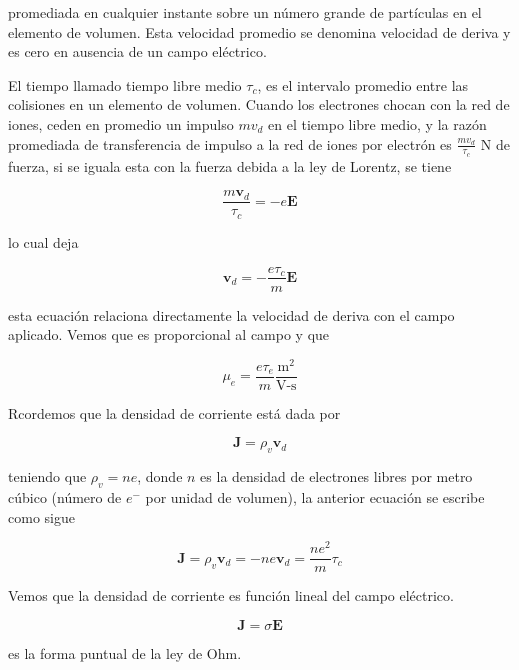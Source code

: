 promediada en cualquier instante sobre un número grande de partículas en el elemento de volumen. Esta velocidad promedio se denomina velocidad de deriva y es cero en ausencia de un campo eléctrico.

El tiempo llamado tiempo libre medio $\tau_c$, es el intervalo promedio entre las colisiones en un elemento de volumen. Cuando los electrones chocan con la red de iones, ceden en promedio un impulso $m v_d$ en el tiempo libre medio, y la razón promediada de transferencia de impulso a la red de iones por electrón es $\frac{m v_d}{\tau_c}$ N de fuerza, si se iguala esta con la fuerza debida a la ley de Lorentz, se tiene

\begin{equation*}
\frac{m \mathbf{v}_d}{\tau_c} = -e \mathbf{E}
\end{equation*}

 lo cual deja

 \begin{equation*}
\mathbf{v}_d = - \frac{e \tau_c}{m} \mathbf{E}
 \end{equation*}

 esta ecuación relaciona directamente la velocidad de deriva con el campo aplicado. Vemos que es proporcional al campo y que 

 \begin{equation*}
\mu_e = \frac{e \tau_e}{m} \frac{\text{m}^2}{\text{V-s}}
 \end{equation*}

 Rcordemos que la densidad de corriente está dada por 

 \begin{equation*}
\mathbf{J} = \rho_v \mathbf{v}_d
 \end{equation*}

 teniendo que $\rho_v = n e$, donde $n$ es la densidad de electrones libres por metro cúbico (número de $e^-$ por unidad de volumen), la anterior ecuación se escribe como sigue

 \begin{equation*}
\mathbf{J} = \rho_v \mathbf{v}_d = - n e \mathbf{v}_d = \frac{n e^2}{m} \tau_c
 \end{equation*}

 Vemos que la densidad de corriente es función lineal del campo eléctrico. 

 \begin{equation*}
\mathbf{J} = \sigma \mathbf{E}
 \end{equation*}

es la forma puntual de la ley de Ohm.


